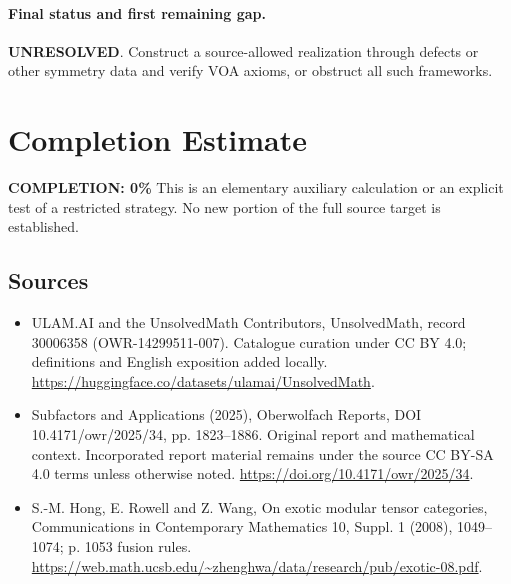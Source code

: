 \documentclass[11pt]{article}
\begin{document}
\paragraph{Final status and first remaining gap.}
\textbf{UNRESOLVED}. Construct a source-allowed realization through defects or other symmetry data and verify VOA axioms, or obstruct all such frameworks.

\section{Completion Estimate}
\noindent\textbf{COMPLETION: 0\%}
This is an elementary auxiliary calculation or an explicit test of a restricted strategy. No new portion of the full source target is established.

\subsection{Sources}
\begin{itemize}
\item[\hypertarget{source:30006358:1}{S1}] ULAM.AI and the UnsolvedMath Contributors, UnsolvedMath, record 30006358 (OWR-14299511-007). Catalogue curation under CC BY 4.0; definitions and English exposition added locally.
\url{https://huggingface.co/datasets/ulamai/UnsolvedMath}.
\item[\hypertarget{source:30006358:2}{S2}] Subfactors and Applications (2025), Oberwolfach Reports, DOI 10.4171/owr/2025/34, pp. 1823--1886. Original report and mathematical context. Incorporated report material remains under the source CC BY-SA 4.0 terms unless otherwise noted.
\url{https://doi.org/10.4171/owr/2025/34}.
\end{itemize}
\label{end:30006358}

\begin{itemize}
\item[\hypertarget{source:30006358:E1}{E1}] S.-M. Hong, E. Rowell and Z. Wang, On exotic modular tensor categories, Communications in Contemporary Mathematics 10, Suppl. 1 (2008), 1049–1074; p. 1053 fusion rules.
\url{https://web.math.ucsb.edu/~zhenghwa/data/research/pub/exotic-08.pdf}.
\end{itemize}
\end{document}
